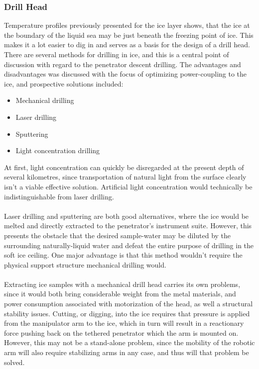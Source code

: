 \subsubsection{Drill Head}
Temperature profiles previously presented for the ice layer shows, that the ice at the boundary of the liquid sea may be just beneath the freezing point of ice. This makes it a lot easier to dig in and serves as a basis for the design of a drill head.\\
There are several methods for drilling in ice, and this is a central point of discussion with regard to the penetrator descent drilling. The advantages and disadvantages was discussed with the focus of optimizing power-coupling to the ice, and prospective solutions included:
\begin{itemize}
\item Mechanical drilling
\item Laser drilling
\item Sputtering
\item Light concentration drilling
\end{itemize}
At first, light concentration can quickly be disregarded at the present depth of several kilometres, since transportation of natural light from the surface clearly isn't a viable effective solution. Artificial light concentration would technically be indistinguishable from laser drilling.\\
\\
Laser drilling and sputtering are both good alternatives, where the ice would be melted and directly extracted to the penetrator's instrument suite. However, this presents the obstacle that the desired sample-water may be diluted by the surrounding naturally-liquid water and defeat the entire purpose of drilling in the soft ice ceiling. One major advantage is that this method wouldn't require the physical support structure mechanical drilling would.\\
\\
Extracting ice samples with a mechanical drill head carries its own problems, since it would both bring considerable weight from the metal materials, and power consumption associated with motorization of the head, as well a structural stability issues. Cutting, or digging, into the ice requires that pressure is applied from the manipulator arm to the ice, which in turn will result in a reactionary force pushing back on the tethered penetrator which the arm is mounted on. However, this may not be a stand-alone problem, since the mobility of the robotic arm will also require stabilizing arms in any case, and thus will that problem be solved.\\
